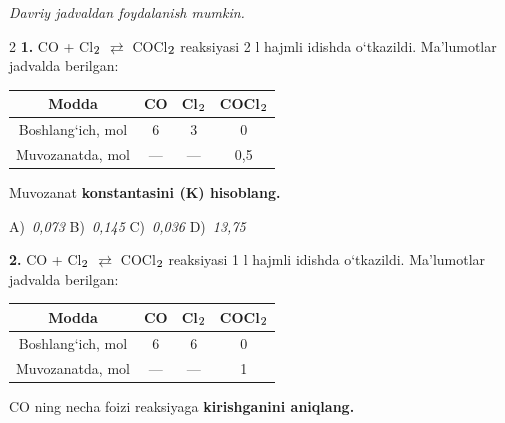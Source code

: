\documentclass[11pt,a4paper]{article}
\renewcommand{\normalsize}{\fontsize{10.9}{13.4}\selectfont}
\renewcommand{\textsubscript}[1]{\ensuremath{_{\text{\fontsize{8}{8}\selectfont #1}}}}
\begin{document}
\normalsize
\thispagestyle{first}
\noindent{}
\par\medskip
\noindent\textit{Davriy jadvaldan foydalanish mumkin.}
\par\medskip
\begin{multicols}{2}
\noindent\textbf{1.} CO + Cl\textsubscript{2} $\rightleftarrows$ COCl\textsubscript{2} reaksiyasi 2 l hajmli idishda o`tkazildi. Ma'lumotlar jadvalda berilgan:
\begin{center}
\renewcommand{\arraystretch}{1.15}
\begin{tabular}{|c|c|c|c|}\hline
\textbf{Modda} & \textbf{CO} & \textbf{Cl\textsubscript{2}} & \textbf{COCl\textsubscript{2}} \\ \hline
Boshlang`ich, mol & 6 & 3 & 0 \\ \hline
Muvozanatda, mol & --- & --- & 0,5 \\ \hline
\end{tabular}
\end{center}
Muvozanat \textbf{konstantasini (K) hisoblang.}

\noindent A)~\textsl{0,073} \hfill B)~\textsl{0,145} \hfill C)~\textsl{0,036} \hfill D)~\textsl{13,75}\par
\vspace{4pt}
\noindent\textbf{2.} CO + Cl\textsubscript{2} $\rightleftarrows$ COCl\textsubscript{2} reaksiyasi 1 l hajmli idishda o`tkazildi. Ma'lumotlar jadvalda berilgan:
\begin{center}
\renewcommand{\arraystretch}{1.15}
\begin{tabular}{|c|c|c|c|}\hline
\textbf{Modda} & \textbf{CO} & \textbf{Cl\textsubscript{2}} & \textbf{COCl\textsubscript{2}} \\ \hline
Boshlang`ich, mol & 6 & 6 & 0 \\ \hline
Muvozanatda, mol & --- & --- & 1 \\ \hline
\end{tabular}
\end{center}
CO ning necha foizi reaksiyaga \textbf{kirishganini aniqlang.}


\end{multicols}
\end{document}
